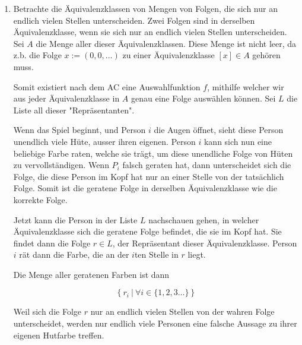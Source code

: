 \documentclass[12pt]{article}
\begin{document}
\begin{enumerate}[label=(\alph*)]
    Also rät $P_k$ tatsächlich richtig. Also rät mit dieser Strategie immer mindestens eine Person richtig.

    \item Betrachte die Äquivalenzklassen von Mengen von Folgen, die sich nur an endlich vielen Stellen unterscheiden. Zwei Folgen sind in derselben Äquivalenzklasse, wenn sie sich nur an endlich vielen Stellen unterscheiden. Sei $A$ die Menge aller dieser Äquivalenzklassen. Diese Menge ist nicht leer, da z.b. die Folge $x:= (0, 0, \dots)$ zu einer Äquivalenzklasse $[x] \in A$ gehören muss.
    
    Somit existiert nach dem AC eine Auswahlfunktion $f$, mithilfe welcher wir aus jeder Äquivalenzklasse in $A$ genau eine Folge auswählen können. Sei $L$ die Liste all dieser "Repräsentanten".
    
    Wenn das Spiel beginnt, und Person $i$ die Augen öffnet, sieht diese Person unendlich viele Hüte, ausser ihren eigenen. Person $i$ kann sich nun eine beliebige Farbe raten, welche sie trägt, um diese unendliche Folge von Hüten zu vervollständigen. Wenn $P_i$ falsch geraten hat, dann unterscheidet sich die Folge, die diese Person im Kopf hat nur an einer Stelle von der tatsächlich Folge. Somit ist die geratene Folge in derselben Äquivalenzklasse wie die korrekte Folge. 
    
    Jetzt kann die Person in der Liste $L$ nachschauen gehen, in welcher Äquivalenzklasse sich die geratene Folge befindet, die sie im Kopf hat. Sie findet dann die Folge $r \in L$, der Repräsentant dieser Äquivalenzklasse. Person $i$ rät dann die Farbe, die an der $i$ten Stelle in $r$ liegt.

    Die Menge aller geratenen Farben ist dann

    $$
        \left\{r_i \ |\ \forall i \in \{1,2,3 \dots \}\right\}
    $$

    Weil sich die Folge $r$ nur an endlich vielen Stellen von der wahren Folge unterscheidet, werden nur endlich viele Personen eine falsche Aussage zu ihrer eigenen Hutfarbe treffen.
    
\end{enumerate}

\newpage
\end{document}
